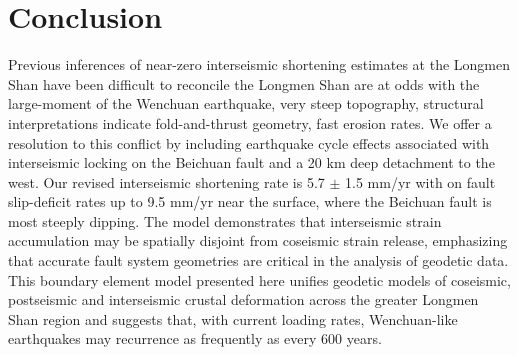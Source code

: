 \documentclass[12pt]{article}
\begin{document}
\section{Conclusion}
Previous inferences of near-zero interseismic shortening estimates at the Longmen Shan have been difficult to reconcile the Longmen Shan are at odds with the large-moment of the Wenchuan earthquake, very steep topography, structural interpretations indicate fold-and-thrust geometry, fast erosion rates. We offer a resolution to this conflict by including earthquake cycle effects associated with interseismic locking on the Beichuan fault and a 20 km deep detachment to the west. Our revised interseismic shortening rate is 5.7 $\pm$ 1.5 mm/yr with on fault slip-deficit rates up to 9.5 mm/yr near the surface, where the Beichuan fault is most steeply dipping. The model demonstrates that interseismic strain accumulation may be spatially disjoint from coseismic strain release, emphasizing that accurate fault system geometries are critical in the analysis of geodetic data. This boundary element model presented here unifies geodetic models of coseismic, postseismic and interseismic crustal deformation across the greater Longmen Shan region and suggests that, with current loading rates, Wenchuan-like earthquakes may recurrence as frequently as every 600 years.



\end{document}

